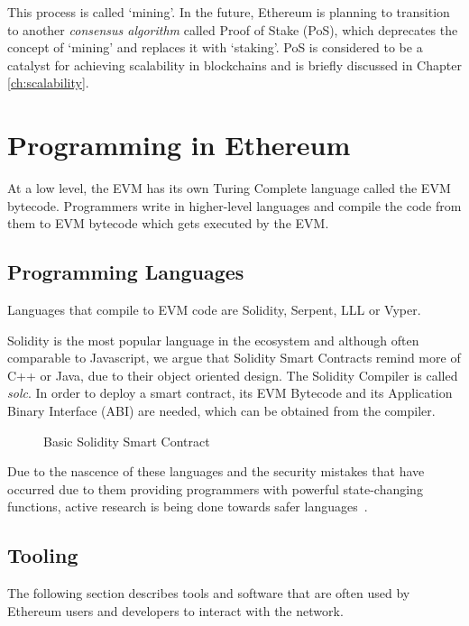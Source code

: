 This process is called `mining'. In the future, Ethereum is planning to transition to another \textit{consensus algorithm} called Proof of Stake (PoS), which deprecates the concept of `mining' and replaces it with `staking'. PoS is considered to be a catalyst for achieving scalability in blockchains and is briefly discussed in Chapter \ref{ch:scalability}.


\section{Programming in Ethereum}
At a low level, the EVM has its own Turing Complete language called the EVM bytecode. Programmers write in higher-level languages and compile the code from them to EVM bytecode which gets executed by the EVM\@.

\subsection{Programming Languages}
Languages that compile to EVM code are Solidity, Serpent, LLL or Vyper. 

Solidity is the most popular language in the ecosystem and although often comparable to Javascript, we argue that Solidity Smart Contracts remind more of C++ or Java, due to their object oriented design. The Solidity Compiler is called \textit{solc}. In order to deploy a smart contract, its EVM Bytecode and its Application Binary Interface (ABI) are needed, which can be obtained from the compiler.

\begin{figure}[ht]
    \centering
    
    \caption{Basic Solidity Smart Contract}
    \label{fig:smart_contract}
\end{figure}

Due to the nascence of these languages and the security mistakes that have occurred due to them providing programmers with powerful state-changing functions, active research is being done towards safer languages~\cite{bamboo}.

\subsection{Tooling}
The following section describes tools and software that are often used by Ethereum users and developers to interact with the network.

